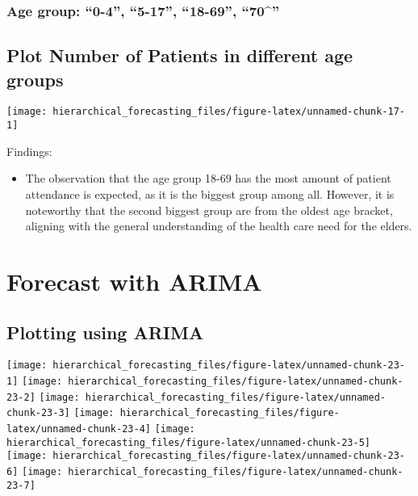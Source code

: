 \documentclass[
]{article}
\providecommand{\tightlist}{%
  \setlength{\itemsep}{0pt}\setlength{\parskip}{0pt}}
\begin{document}
\hypertarget{age-group-0-4-5-17-18-69-70}{%
\subsubsection{Age group: ``0-4'', ``5-17'', ``18-69'', ``70\^{}''}\label{age-group-0-4-5-17-18-69-70}}

\hypertarget{plot-number-of-patients-in-different-age-groups}{%
\subsection{Plot Number of Patients in different age groups}\label{plot-number-of-patients-in-different-age-groups}}

\texttt{[image: hierarchical\_forecasting\_files/figure-latex/unnamed-chunk-17-1]}

Findings:

\begin{itemize}
\tightlist
\item
  The observation that the age group 18-69 has the most amount of patient attendance is expected, as it is the biggest group among all. However, it is noteworthy that the second biggest group are from the oldest age bracket, aligning with the general understanding of the health care need for the elders.
\end{itemize}

\hypertarget{forecast-with-arima}{%
\section{Forecast with ARIMA}\label{forecast-with-arima}}

\hypertarget{plotting-using-arima}{%
\subsection{Plotting using ARIMA}\label{plotting-using-arima}}

\texttt{[image: hierarchical\_forecasting\_files/figure-latex/unnamed-chunk-23-1]}
\texttt{[image: hierarchical\_forecasting\_files/figure-latex/unnamed-chunk-23-2]}
\texttt{[image: hierarchical\_forecasting\_files/figure-latex/unnamed-chunk-23-3]}
\texttt{[image: hierarchical\_forecasting\_files/figure-latex/unnamed-chunk-23-4]}
\texttt{[image: hierarchical\_forecasting\_files/figure-latex/unnamed-chunk-23-5]}
\texttt{[image: hierarchical\_forecasting\_files/figure-latex/unnamed-chunk-23-6]}
\texttt{[image: hierarchical\_forecasting\_files/figure-latex/unnamed-chunk-23-7]}
\end{document}
